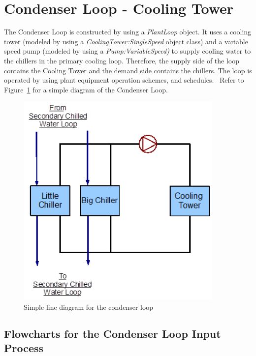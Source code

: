 \section{Condenser Loop - Cooling Tower}\label{condenser-loop---cooling-tower}

The Condenser Loop is constructed by using a \emph{PlantLoop} object. It uses a cooling tower (modeled by using a \emph{CoolingTower:SingleSpeed} object class) and a variable speed pump (modeled by using a \emph{Pump:VariableSpeed)} to supply cooling water to the chillers in the primary cooling loop. Therefore, the supply side of the loop contains the Cooling Tower and the demand side contains the chillers. The loop is operated by using plant equipment operation schemes, and schedules. ~Refer to Figure~\ref{fig:simple-line-diagram-for-the-condenser-loop-001} for a simple diagram of the Condenser Loop.

\begin{figure}[hbtp] %
\centering
\includegraphics[width=0.9\textwidth, height=0.9\textheight, keepaspectratio=true]{media/image116.png}
\caption{Simple line diagram for the condenser loop \protect \label{fig:simple-line-diagram-for-the-condenser-loop-001}}
\end{figure}

\subsection{Flowcharts for the Condenser Loop Input Process}\label{flowcharts-for-the-condenser-loop-input-process-000}

